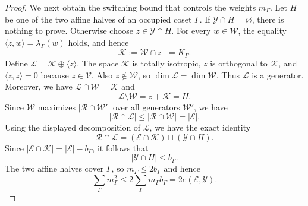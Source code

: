 \documentclass[11pt]{article}
\begin{document}
\begin{proof}
We next obtain the switching bound that controls the weights
\(m_\Gamma\).  Let \(H\) be one of the two affine halves of an occupied
coset \(\Gamma\).  If \(\mathcal Y\cap H=\varnothing\), there is nothing to
prove.  Otherwise choose \(z\in\mathcal Y\cap H\).  For every
\(w\in\mathcal W\), the equality
\(\langle z,w\rangle=\lambda_\Gamma(w)\) holds, and hence
\[
 \mathcal K:=\mathcal W\cap z^\perp=K_\Gamma.
\]
Define \(\mathcal L=\mathcal K\oplus\langle z\rangle\). The space \(\mathcal K\) is totally isotropic, \(z\) is orthogonal to
\(\mathcal K\), and \(\langle z,z\rangle=0\) because
\(z\in\mathcal V\).  Also \(z\notin\mathcal W\), so
\(\dim\mathcal L=\dim\mathcal W\).  Thus \(\mathcal L\) is a generator.
Moreover, we have \(\mathcal L\cap\mathcal W=\mathcal K\) and
\[
 \mathcal L\setminus\mathcal W=z+\mathcal K=H.
\]
Since \(\mathcal W\) maximizes \(|\mathcal R\cap\mathcal W'|\) over all
generators \(\mathcal W'\), we have
\[
 |\mathcal R\cap\mathcal L|
 \le
 |\mathcal R\cap\mathcal W|
 =|\mathcal E|.
\]
Using the displayed decomposition of \(\mathcal L\), we have the exact
identity
\[
 \mathcal R\cap\mathcal L
 =
 (\mathcal E\cap\mathcal K)
 \sqcup
 (\mathcal Y\cap H).
\]
Since \(|\mathcal E\cap\mathcal K|=|\mathcal E|-b_\Gamma\), it follows
that
\[
 |\mathcal Y\cap H|\le b_\Gamma.
\]
The two affine halves cover \(\Gamma\), so \(m_\Gamma\le 2b_\Gamma\) and hence
\begin{equation}
 \sum_\Gamma m_\Gamma^2
 \le
 2\sum_\Gamma m_\Gamma b_\Gamma
 =2e(\mathcal E,\mathcal Y).
\label{eq:weight-energy}
\end{equation}


\end{proof}
\end{document}
